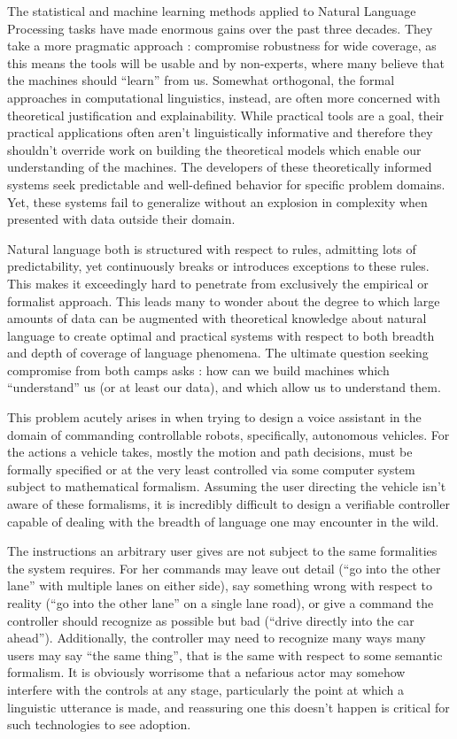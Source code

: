 \documentclass[a4paper, 11pt]{article}
\begin{document}
The statistical and machine learning methods applied to Natural Language
Processing tasks have made enormous gains over the past three decades. They take
a more pragmatic approach : compromise robustness for wide coverage, as this
means the tools will be usable and by non-experts, where many believe that the
machines should ``learn'' from us. Somewhat orthogonal, the formal approaches in
computational linguistics, instead, are often more concerned with theoretical
justification and explainability. While practical tools are a goal, their
practical applications often aren't linguistically informative and therefore
they shouldn't override work on building the theoretical models which enable our
understanding of the machines. The developers of these theoretically informed
systems seek predictable and well-defined behavior for specific problem domains.
Yet, these systems fail to generalize without an explosion in complexity when
presented with data outside their domain.

Natural language both is structured with respect to rules, admitting lots of
predictability, yet continuously breaks or introduces exceptions to these rules.
This makes it exceedingly hard to penetrate from exclusively the empirical or
formalist approach. This leads many to wonder about the degree to which large
amounts of data can be augmented with theoretical knowledge about natural
language to create optimal and practical systems with respect to both breadth
and depth of coverage of language phenomena. The ultimate question seeking
compromise from both camps asks : how can we build machines which ``understand'' us
(or at least our data), and which allow us to understand them.

This problem acutely arises in when trying to design a voice assistant in the
domain of commanding controllable robots, specifically, autonomous vehicles. For
the actions a vehicle takes, mostly the motion and path decisions, must be
formally specified or at the very least controlled via some computer system
subject to mathematical formalism. Assuming the user directing the vehicle isn't
aware of these formalisms, it is incredibly difficult to design a verifiable
controller capable of dealing with the breadth of language one may encounter in
the wild.

The instructions an arbitrary user gives are not subject to the same formalities
the system requires. For her commands may leave out detail (``go into the other
lane'' with multiple lanes on either side), say something wrong with respect to
reality (``go into the other lane'' on a single lane road), or give a command
the controller should recognize as possible but bad (``drive directly into the
car ahead''). Additionally, the controller may need to recognize many ways many
users may say ``the same thing'', that is the same with respect to some semantic
formalism. It is obviously worrisome that a nefarious actor may somehow
interfere with the controls at any stage, particularly the point at which a
linguistic utterance is made, and reassuring one this doesn't happen is critical
for such technologies to see adoption.
\end{document}

